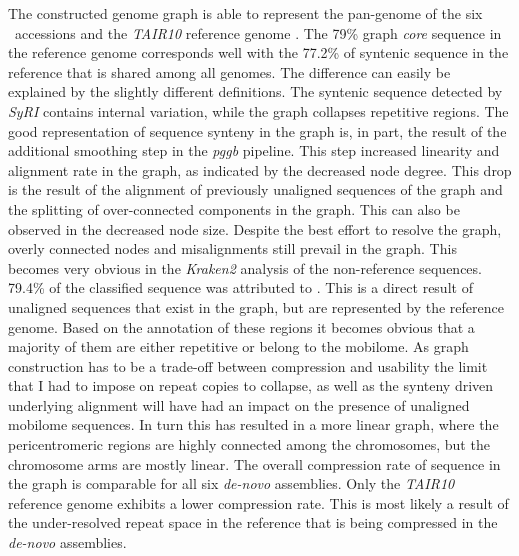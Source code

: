 The constructed genome graph is able to represent the pan-genome of the six \ath\ accessions and the \textit{TAIR10} reference genome \citep{Berardini2015-is}. The 79\% graph \textit{core} sequence in the reference genome corresponds well with the 77.2\% of syntenic sequence in the reference that is shared among all genomes. The difference can easily be explained by the slightly different definitions. The syntenic sequence detected by \textit{SyRI} contains internal variation, while the graph collapses repetitive regions. The good representation of sequence synteny in the graph is, in part, the result of the additional smoothing step in the \textit{pggb} pipeline. This step increased linearity and alignment rate in the graph, as indicated by the decreased node degree. This drop is the result of the alignment of previously unaligned sequences of the graph and the splitting of over-connected components in the graph. This can also be observed in the decreased node size. Despite the best effort to resolve the graph, overly connected nodes and misalignments still prevail in the graph. This becomes very obvious in the \textit{Kraken2} \citep{Wood2019-jh} analysis of the non-reference sequences. 79.4\% of the classified sequence was attributed to \ath. This is a direct result of unaligned sequences that exist in the graph, but are represented by the reference genome. Based on the annotation of these regions it becomes obvious that a majority of them are either repetitive or belong to the mobilome. As graph construction has to be a trade-off between compression and usability the limit that I had to impose on repeat copies to collapse, as well as the synteny driven underlying alignment will have had an impact on the presence of unaligned mobilome sequences. In turn this has resulted in a more linear graph, where the pericentromeric regions are highly connected among the chromosomes, but the chromosome arms are mostly linear. The overall compression rate of sequence in the graph is comparable for all six \textit{de-novo }assemblies. Only the \textit{TAIR10} reference genome exhibits a lower compression rate. This is most likely a result of the under-resolved repeat space in the reference that is being compressed in the \textit{de-novo} assemblies. \newline
